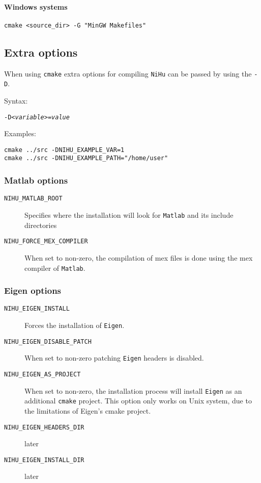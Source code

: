 \documentclass[a4paper,10pt]{article}
\begin{document}
\paragraph{Windows systems}

\begin{verbatim}
cmake <source_dir> -G "MinGW Makefiles"
\end{verbatim}


\subsection{Extra options}

When using \texttt{cmake} extra options for compiling \texttt{NiHu} can be passed by using the \texttt{-D}.

Syntax:

\texttt{-D\itshape{<variable>}=\itshape{value}}

Examples:

\begin{verbatim}
cmake ../src -DNIHU_EXAMPLE_VAR=1
cmake ../src -DNIHU_EXAMPLE_PATH="/home/user"
\end{verbatim}

\subsubsection{Matlab options}

\begin{description}
	\item [\texttt{NIHU\_MATLAB\_ROOT}] Specifies where the installation will look for \texttt{Matlab} and its include directories
	\item [\texttt{NIHU\_FORCE\_MEX\_COMPILER}] When set to non-zero, the compilation of mex files is done using the mex compiler of \texttt{Matlab}.
\end{description}

\subsubsection{Eigen options}

\begin{description}
	\item [\texttt{NIHU\_EIGEN\_INSTALL}] Forces the installation of \texttt{Eigen}.
	\item [\texttt{NIHU\_EIGEN\_DISABLE\_PATCH}] When set to non-zero patching \texttt{Eigen} headers is disabled.
	\item [\texttt{NIHU\_EIGEN\_AS\_PROJECT}] When set to non-zero, the installation process will install \texttt{Eigen} as an additional \texttt{cmake} project. This option only works on Unix system, due to the limitations of Eigen's cmake project.
	\item [\texttt{NIHU\_EIGEN\_HEADERS\_DIR}] later
	\item [\texttt{NIHU\_EIGEN\_INSTALL\_DIR}] later
\end{description}
\end{document}
